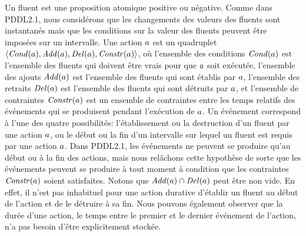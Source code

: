 Un fluent est une proposition atomique positive ou négative. Comme dans PDDL2.1, nous considérons que les changements des valeurs des fluents sont instantanés mais que les conditions sur la valeur des fluents peuvent être imposées sur un intervalle. Une action $a$ est un quadruplet $\langle\mathit{Cond}(a),\mathit{Add}(a),\mathit{Del}(a),\mathit{Constr}(a)\rangle$, où l'ensemble des conditions $\mathit{Cond}(a)$ est l'ensemble des fluents qui doivent être vrais pour que $a$ soit exécutée, l'ensemble des ajouts $\mathit{Add}(a)$ est l'ensemble des fluents qui sont établis par $a$, l'ensemble des retraits $\mathit{Del}(a)$ est l'ensemble des fluents qui sont détruits par $a$, et l'ensemble de contraintes $\mathit{Constr}(a)$ est un ensemble de contraintes entre les temps relatifs des événements qui se produisent pendant l'exécution de $a$. Un événement correspond à l'une des quatre possibilités: l'établissement ou la destruction d'un fluent par une action $a$, ou le début ou la fin d'un intervalle sur lequel un fluent est requis par une action $a$. Dans PDDL2.1, les événements ne peuvent se produire qu'au début ou à la fin des actions, mais nous rel\^{a}chons cette hypothèse de sorte que les événements peuvent se produire à tout moment à condition que les contraintes $\mathit{Constr}(a)$ soient satisfaites. Notons que $\mathit{Add}(a) \cap \mathit{Del}(a)$ peut être non vide. En effet, il n'est pas inhabituel pour une action durative d'établir un fluent au début de l'action et de le détruire à sa fin. Nous pouvons également observer que la durée d'une action, le temps entre le premier et le dernier événement de l'action, n'a pas besoin d'être explicitement stockée.


